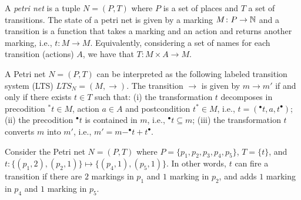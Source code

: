 \begin{definition}
A \emph{petri net} is a tuple $N = (P, T)$ where $P$ is a set of places and $T$ a set of transitions.
	The state of a petri net is given by a marking $M \colon P \to \mathbb{N}$ and a transition is a function that takes a marking and an action and returns another marking, i.e., $t \colon M \to M$.
	Equivalently, considering a set of names for each transition (actions) $A$, we have that $T \colon M \times A \to M$.
\end{definition}



\begin{remark}
    A Petri net $N = (P, T)$ can be interpreted as the following labeled transition system (LTS) $LTS_N = (M, \to)$.
	The transition $\to$ is given by $m \to m'$ if and only if there exists $t \in T$ such that: (i) the transformation $t$ decomposes in precodition $^*t \in M$, action $a \in A$ and postcondition $t^* \in M$, i.e., $t = (^\bullet t, a, t^\bullet)$; 
 (ii) the precodition $^\bullet t$ is contained in $m$, i.e., $^\bullet t \subseteq m$; 
 (iii) the transformation $t$ converts $m$ into $m'$, i.e., $m' = m - ^\bullet t + t^\bullet$.
\end{remark}

\begin{example}
    Consider the Petri net $N = (P, T)$ where $P = \{ p_1, p_2, p_3, p_4, p_5 \}$, $T = \{ t \}$, and $t \colon \{ (p_1, 2), (p_2, 1) \} \mapsto \{ (p_4, 1), (p_5, 1) \}$.
	In other words, $t$ can fire a transition if there are $2$ markings in $p_1$ and $1$ marking in $p_2$, and adds $1$ marking in $p_4$ and $1$ marking in $p_5$.  
    \begin{center}
    \end{center}
\end{example}





